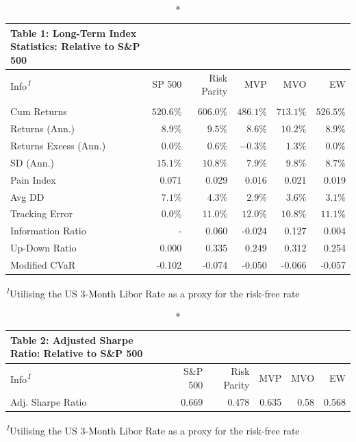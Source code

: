 \documentclass[12pt,preprint, authoryear]{elsarticle}
\numberwithin{equation}{section}
\numberwithin{figure}{section}
\numberwithin{table}{section}
\begin{document}
\setlength{\LTpost}{0mm}
\begin{longtable}{lrrrrr}
\caption*{
{\large Table 1: Long-Term Index Statistics: Relative to S\&P 500}
} \\ 
\toprule
Info\textsuperscript{\textit{1}} & SP 500 & Risk Parity & MVP & MVO & EW \\ 
\midrule\addlinespace[2.5pt]
\multicolumn{6}{l}{Historical} \\ 
\midrule\addlinespace[2.5pt]
Cum Returns & $520.6\%$ & $606.0\%$ & $486.1\%$ & $713.1\%$ & $526.5\%$ \\ 
Returns (Ann.) & $8.9\%$ & $9.5\%$ & $8.6\%$ & $10.2\%$ & $8.9\%$ \\ 
Returns Excess (Ann.) & $0.0\%$ & $0.6\%$ & $-0.3\%$ & $1.3\%$ & $0.0\%$ \\ 
SD (Ann.) & $15.1\%$ & $10.8\%$ & $7.9\%$ & $9.8\%$ & $8.7\%$ \\ 
Pain Index & 0.071 & 0.029 & 0.016 & 0.021 & 0.019 \\ 
Avg DD & $7.1\%$ & $4.3\%$ & $2.9\%$ & $3.6\%$ & $3.1\%$ \\ 
Tracking Error & $0.0\%$ & $11.0\%$ & $12.0\%$ & $10.8\%$ & $11.1\%$ \\ 
Information Ratio & - & 0.060 & -0.024 & 0.127 & 0.004 \\ 
Up-Down Ratio & 0.000 & 0.335 & 0.249 & 0.312 & 0.254 \\ 
Modified CVaR & -0.102 & -0.074 & -0.050 & -0.066 & -0.057 \\ 
\bottomrule
\end{longtable}
\begin{minipage}{\linewidth}
\textsuperscript{\textit{1}}Utilising the US 3-Month Libor Rate as a proxy for the risk-free rate\\
\end{minipage}

\setlength{\LTpost}{0mm}
\begin{longtable}{lrrrrr}
\caption*{
{\large Table 2: Adjusted Sharpe Ratio: Relative to S\&P 500}
} \\ 
\toprule
Info\textsuperscript{\textit{1}} & S\&P 500 & Risk Parity & MVP & MVO & EW \\ 
\midrule\addlinespace[2.5pt]
Adj. Sharpe Ratio & 0.669 & 0.478 & 0.635 & 0.58 & 0.568 \\ 
\bottomrule
\end{longtable}
\begin{minipage}{\linewidth}
\textsuperscript{\textit{1}}Utilising the US 3-Month Libor Rate as a proxy for the risk-free rate\\
\end{minipage}
\end{document}
